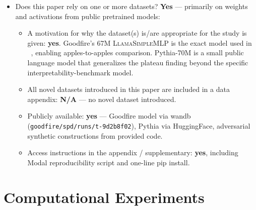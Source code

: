\documentclass[letterpaper]{article}
\begin{document}
\begin{itemize}
\item Does this paper rely on one or more datasets?
\textbf{Yes} --- primarily on weights and activations from public pretrained models:
\begin{itemize}
\item A motivation for why the dataset(s) is/are appropriate for the study is given: \textbf{yes}. Goodfire's 67M \textsc{LlamaSimpleMLP} is the exact model used in \vpd\ \cite{bushnaq2026vpd}, enabling apples-to-apples comparison. Pythia-70M \cite{biderman2023pythia} is a small public language model that generalizes the plateau finding beyond the specific interpretability-benchmark model.
\item All novel datasets introduced in this paper are included in a data appendix: \textbf{N/A} --- no novel dataset introduced.
\item Publicly available: \textbf{yes} --- Goodfire model via wandb (\texttt{goodfire/spd/runs/t-9d2b8f02}), Pythia via HuggingFace, adversarial synthetic constructions from provided code.
\item Access instructions in the appendix / supplementary: \textbf{yes}, including Modal reproducibility script and one-line pip install.
\end{itemize}
\end{itemize}

\section{Computational Experiments}
\end{document}
